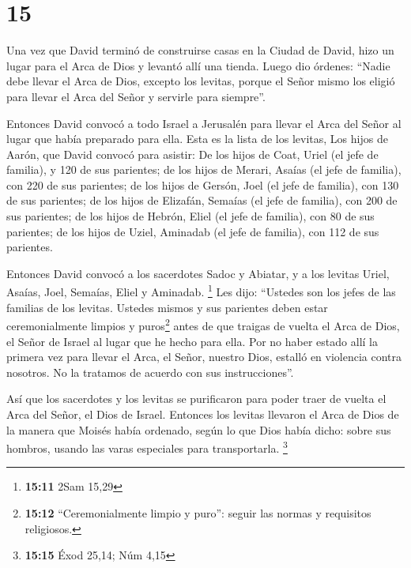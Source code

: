 \hypertarget{section-14}{%
\section{15}\label{section-14}}

 Una vez que David terminó de construirse casas en la
Ciudad de David, hizo un lugar para el Arca de Dios y levantó allí una
tienda.  Luego dio órdenes: ``Nadie debe llevar el Arca de
Dios, excepto los levitas, porque el Señor mismo los eligió para llevar
el Arca del Señor y servirle para siempre''.

 Entonces David convocó a todo Israel a Jerusalén para
llevar el Arca del Señor al lugar que había preparado para ella.
 Esta es la lista de los levitas, Los hijos de Aarón, que
David convocó para asistir:  De los hijos de Coat, Uriel
(el jefe de familia), y 120 de sus parientes;  de los
hijos de Merari, Asaías (el jefe de familia), con 220 de sus parientes;
 de los hijos de Gersón, Joel (el jefe de familia), con
130 de sus parientes;  de los hijos de Elizafán, Semaías
(el jefe de familia), con 200 de sus parientes;  de los
hijos de Hebrón, Eliel (el jefe de familia), con 80 de sus parientes;
 de los hijos de Uziel, Aminadab (el jefe de familia),
con 112 de sus parientes.

 Entonces David convocó a los sacerdotes Sadoc y Abiatar,
y a los levitas Uriel, Asaías, Joel, Semaías, Eliel y Aminadab.
\footnote{\textbf{15:11} 2Sam 15,29}  Les dijo: ``Ustedes
son los jefes de las familias de los levitas. Ustedes mismos y sus
parientes deben estar ceremonialmente limpios y puros\footnote{\textbf{15:12}
  ``Ceremonialmente limpio y puro'': seguir las normas y requisitos
  religiosos.} antes de que traigas de vuelta el Arca de Dios, el Señor
de Israel al lugar que he hecho para ella.  Por no haber
estado allí la primera vez para llevar el Arca, el Señor, nuestro Dios,
estalló en violencia contra nosotros. No la tratamos de acuerdo con sus
instrucciones''.

 Así que los sacerdotes y los levitas se purificaron para
poder traer de vuelta el Arca del Señor, el Dios de Israel.
 Entonces los levitas llevaron el Arca de Dios de la
manera que Moisés había ordenado, según lo que Dios había dicho: sobre
sus hombros, usando las varas especiales para transportarla. \footnote{\textbf{15:15}
  Éxod 25,14; Núm 4,15}

